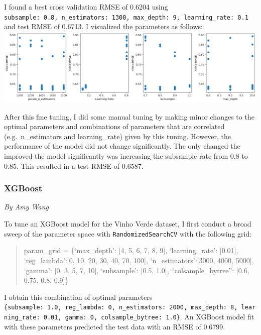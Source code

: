 \documentclass[
  letterpaper,
  DIV=11,
  numbers=noendperiod]{scrartcl}
\begin{document}
I found a best cross validation RMSE of 0.6204 using
\texttt{\textquotesingle{}subsample\textquotesingle{}:\ 0.8,\ \textquotesingle{}n\_estimators\textquotesingle{}:\ 1300,\ \textquotesingle{}max\_depth\textquotesingle{}:\ 9,\ \textquotesingle{}learning\_rate\textquotesingle{}:\ 0.1}
and test RMSE of 0.6713. I visualized the parameters as follows:
\includegraphics{Project_Report_Saturn_files/figure-pdf/image.png}

After this fine tuning, I did some manual tuning by making minor changes
to the optimal parameters and combinations of parameters that are
correlated (e.g.~n\_estimators and learning\_rate) given by this tuning.
However, the performance of the model did not change significantly. The
only changed the improved the model significantly was increasing the
subsample rate from 0.8 to 0.85. This resulted in a test RMSE of 0.6587.

\hypertarget{xgboost}{%
\subsubsection{XGBoost}\label{xgboost}}

\emph{By Amy Wang}

To tune an XGBoost model for the Vinho Verde dataset, I first conduct a
broad sweep of the parameter space with \texttt{RandomizedSearchCV} with
the following grid:

\begin{quote}
param\_grid = \{`max\_depth': {[}4, 5, 6, 7, 8, 9{]}, `learning\_rate':
{[}0.01{]}, `reg\_lambda':{[}0, 10, 20, 30, 40, 70, 100{]},
`n\_estimators':{[}3000, 4000, 5000{]}, `gamma': {[}0, 3, 5, 7, 10{]},
`subsample': {[}0.5, 1.0{]}, ``colsample\_bytree'': {[}0.6, 0.75, 0.8,
0.9{]}\}
\end{quote}

I obtain this combination of optimal parameters
\texttt{\{\textquotesingle{}subsample\textquotesingle{}:\ 1.0,\ \textquotesingle{}reg\_lambda\textquotesingle{}:\ 0,\ \textquotesingle{}n\_estimators\textquotesingle{}:\ 2000,\ \textquotesingle{}max\_depth\textquotesingle{}:\ 8,\ \textquotesingle{}learning\_rate\textquotesingle{}:\ 0.01,\ \textquotesingle{}gamma\textquotesingle{}:\ 0,\ \textquotesingle{}colsample\_bytree\textquotesingle{}:\ 1.0\}}.
An XGBoost model fit with these parameters predicted the test data with
an RMSE of 0.6799.
\end{document}
